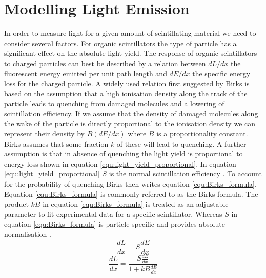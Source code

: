 \section{Modelling Light Emission}\label{sec:geant4Simulation_ModellingLightEmission}
In order to measure light for a given amount of scintillating material we need to consider several factors. For organic scintillators the type of particle has a significant effect on the absolute light yield. The response of organic scintillators to charged particles can best be described by a relation between $dL/dx$ the fluorescent energy emitted per unit path length and $dE/dx$ the specific energy loss for the charged particle.  A widely used relation first suggested by Birks \cite{birks_1964} is based on the assumption that a high ionisation density along the track of the particle leads to quenching from damaged molecules and a lowering of  scintillation efficiency. If we assume that the density of damaged molecules along the wake of the particle is directly proportional to the ionisation density we can represent their density by $B(dE/dx)$ where $B$ is a proportionality constant. Birks assumes that some fraction $k$ of these will lead to quenching\cite{knoll_2010}. A further assumption is that in absence of quenching the light yield is proportional to energy loss shown in equation \ref{equ:light_yield_proportional}. In equation \ref{equ:light_yield_proportional} $S$ is the normal scintillation efficiency \cite{birks_1964}. To account for the probability of quenching Birks then writes equation \ref{equ:Birks_formula}. Equation \ref{equ:Birks_formula} is commonly referred to as the Birks formula. The product $kB$ in equation \ref{equ:Birks_formula} is treated as an adjustable parameter to fit experimental data for a specific scintillator. Whereas $S$ in equation \ref{equ:Birks_formula} is particle specific and provides absolute normalisation \cite{knoll_2010}.  
\begin{equation}
\frac{dL}{dx} = S\frac{dE}{dx}
\label{equ:light_yield_proportional}
\end{equation}
\begin{equation}
\frac{dL}{dx} = \frac{S\frac{dE}{dx}}{1 + kB \frac{dE}{dx}}
\label{equ:Birks_formula}
\end{equation}
